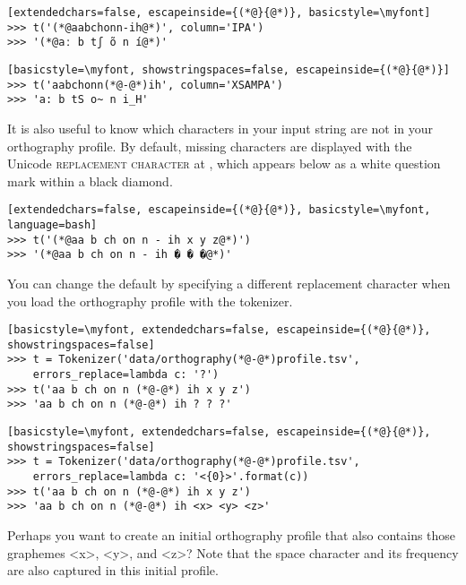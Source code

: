 \documentclass[output=book,nonflat,modfonts,
citecolor=brown,
		]{langsci/langscibook}\usepackage[]{graphicx}\usepackage[]{color}
\begin{document}
\begin{lstlisting}[extendedchars=false, escapeinside={(*@}{@*)}, basicstyle=\myfont]
>>> t('(*@aabchonn-ih@*)', column='IPA')
>>> '(*@aː b tʃ õ n í@*)'
\end{lstlisting}


\begin{lstlisting}[basicstyle=\myfont, showstringspaces=false, escapeinside={(*@}{@*)}]
>>> t('aabchonn(*@-@*)ih', column='XSAMPA')
>>> 'a: b tS o~ n i_H'
\end{lstlisting}


\noindent It is also useful to know which characters in your input string are not in your orthography profile. By default, missing characters are displayed with the Unicode \textsc{replacement character} at , which appears below as a white question mark within a black diamond.

\begin{lstlisting}[extendedchars=false, escapeinside={(*@}{@*)}, basicstyle=\myfont, language=bash]
>>> t('(*@aa b ch on n - ih x y z@*)')
>>> '(*@aa b ch on n - ih � � �@*)'
\end{lstlisting}

\noindent You can change the default by specifying a different replacement character when you load the orthography profile with the tokenizer.

\begin{lstlisting}[basicstyle=\myfont, extendedchars=false, escapeinside={(*@}{@*)}, showstringspaces=false]
>>> t = Tokenizer('data/orthography(*@-@*)profile.tsv', 
	errors_replace=lambda c: '?')
>>> t('aa b ch on n (*@-@*) ih x y z')
>>> 'aa b ch on n (*@-@*) ih ? ? ?'
\end{lstlisting}

\begin{lstlisting}[basicstyle=\myfont, extendedchars=false, escapeinside={(*@}{@*)}, showstringspaces=false]
>>> t = Tokenizer('data/orthography(*@-@*)profile.tsv', 
	errors_replace=lambda c: '<{0}>'.format(c))
>>> t('aa b ch on n (*@-@*) ih x y z')
>>> 'aa b ch on n (*@-@*) ih <x> <y> <z>'
\end{lstlisting}

\noindent Perhaps you want to create an initial orthography profile that also contains those graphemes <x>, <y>, and <z>? Note that the space character and its frequency are also captured in this initial profile.
\end{document}
